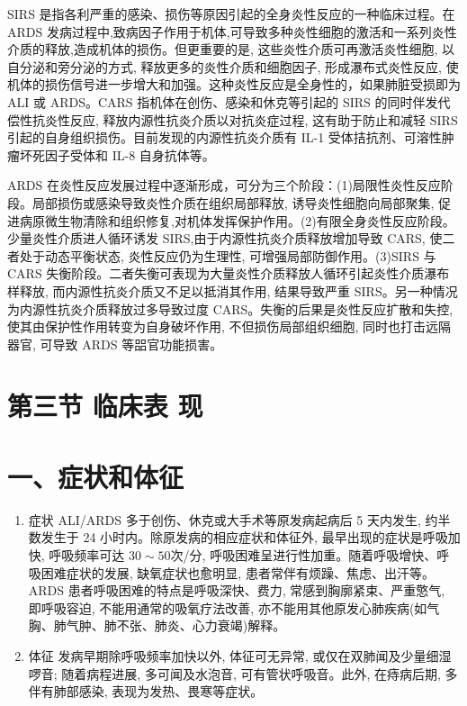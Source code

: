 \documentclass[10pt]{article}
\begin{document}
SIRS 是指各利严重的感染、损伤等原因引起的全身炎性反应的一种临床过程。在 ARDS 发病过程中,致病因子作用于机体,可导致多种炎性细胞的激活和一系列炎性介质的释放,造成机体的损伤。但更重要的是, 这些炎性介质可再激活炎性细胞, 以自分泌和旁分泌的方式, 释放更多的炎性介质和细胞因子, 形成瀑布式炎性反应, 使机体的损伤信号进一步增大和加强。这种炎性反应是全身性的，如果肺脏受损即为 ALI 或 ARDS。CARS 指机体在创伤、感染和休克等引起的 SIRS 的同时伴发代偿性抗炎性反应, 释放内源性抗炎介质以对抗炎症过程, 这有助于防止和减轻 SIRS 引起的自身组织损伤。目前发现的内源性抗炎介质有 IL-1 受体拮抗剂、可溶性肿瘤坏死因子受体和 IL-8 自身抗体等。

ARDS 在炎性反应发展过程中逐渐形成，可分为三个阶段：(1)局限性炎性反应阶段。局部损伤或感染导致炎性介质在组织局部释放, 诱导炎性细胞向局部聚集, 促进病原微生物清除和组织修复,对机体发挥保护作用。(2)有限全身炎性反应阶段。少量炎性介质进人循环诱发 SIRS,由于内源性抗炎介质释放增加导致 CARS, 使二者处于动态平衡状态, 炎性反应仍为生理性, 可增强局部防御作用。(3)SIRS 与 CARS 失衡阶段。二者失衡可表现为大量炎性介质释放人循环引起炎性介质瀑布样释放, 而内源性抗炎介质又不足以抵消其作用, 结果导致严重 SIRS。另一种情况为内源性抗炎介质释放过多导致过度 CARS。失衡的后果是炎性反应扩散和失控, 使其由保护性作用转变为自身破坏作用, 不但损伤局部组织细胞, 同时也打击远隔器官, 可导致 ARDS 等㗊官功能损害。

\section*{第三节 临床表 现}
\section*{一、症状和体征}
\begin{enumerate}
  \item 症状 ALI/ARDS 多于创伤、休克或大手术等原发病起病后 5 天内发生, 约半数发生于 24 小时内。除原发病的相应症状和体征外, 最早出现的症状是呼吸加快, 呼吸频率可达 $30 \sim 50$次/分, 呼吸困难呈进行性加重。随着呼吸增快、呼吸困难症状的发展, 缺氧症状也愈明显, 患者常伴有烦躁、焦虑、出汗等。ARDS 患者呼吸困难的特点是呼吸深快、费力, 常感到胸廓紧束、严重憼气, 即呼吸容迫, 不能用通常的吸氧疗法改善, 亦不能用其他原发心肺疾病(如气胸、肺气肿、肺不张、肺炎、心力衰竭)解释。

  \item 体征 发病早期除呼吸频率加快以外, 体征可无异常, 或仅在双肺闻及少量细湿啰音; 随着病程进展, 多可闻及水泡音, 可有管状呼吸音。此外, 在痔病后期, 多伴有肺部感染, 表现为发热、畏寒等症状。

\end{enumerate}
\end{document}
